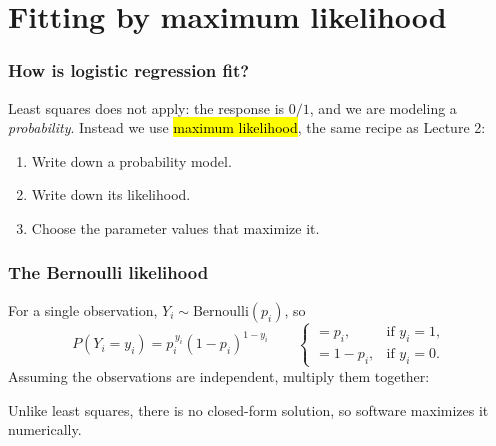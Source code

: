 \documentclass[slidestop,compress,mathserif]{beamer}
\begin{document}
\section{Fitting by maximum likelihood}
\begin{frame}
\frametitle{How is logistic regression fit?}

Least squares does not apply: the response is $0/1$, and we are modeling a \emph{probability}. Instead we use \hl{maximum likelihood}, the same recipe as Lecture 2:

\begin{enumerate}
\item Write down a probability model.
\item Write down its likelihood.
\item Choose the parameter values that maximize it.
\end{enumerate}


\end{frame}
\begin{frame}
\frametitle{The Bernoulli likelihood}

For a single observation, $Y_i\sim\text{Bernoulli}(p_i)$, so
$$
P(Y_i=y_i)=p_i^{\,y_i}(1-p_i)^{1-y_i}
\qquad
\begin{cases}
=p_i, & \text{if } y_i=1,\\[2pt]
=1-p_i, & \text{if } y_i=0.
\end{cases}
$$
\pause
Assuming the observations are independent, multiply them together:


Unlike least squares, there is no closed-form solution, so software maximizes it numerically.

\end{frame}
\end{document}
